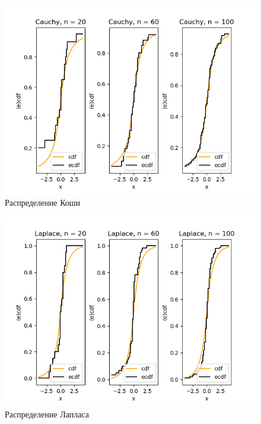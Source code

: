 \documentclass[../body.tex]{subfiles}
\begin{document}
\begin{figure}[H]
	\centering
	\includegraphics[width=\textwidth, height =0.4\textheight]{img/CauchyCDF.png}
	\caption{Распределение Коши}
	\label{fig:cauchy_cdf}
\end{figure}


\begin{figure}[H]
	\centering
	\includegraphics[width=\textwidth, height =0.4\textheight]{img/LaplaceCDF.png}
	\caption{Распределение Лапласа}
	\label{fig:laplace_cdf}
\end{figure}
\end{document}
